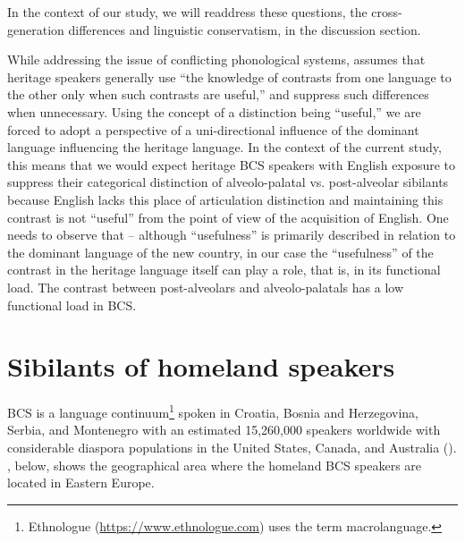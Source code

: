 \documentclass[output=paper,modfonts,nonflat,
]{langsci/langscibook}
\begin{document}
In the context of our study, we will readdress these questions, the cross-generation differences and linguistic conservatism, in the discussion section.



While addressing the issue of conflicting phonological systems, \citet{Polinskyinprep} assumes that heritage speakers generally use “the knowledge of contrasts from one language to the other only when such contrasts are useful,” and suppress such differences when unnecessary. Using the concept of a distinction being “useful,” we are forced to adopt a perspective of a uni-directional influence of the dominant language influencing the heritage language. In the context of the current study, this means that we would expect heritage BCS speakers with English exposure to suppress their categorical distinction of alveolo-palatal vs. post-alveolar sibilants because English lacks this place of articulation distinction and maintaining this contrast is not “useful” from the point of view of the acquisition of English. One needs to observe that – although “usefulness” is primarily described in relation to the dominant language of the new country, in our case the “usefulness” of the contrast in the heritage language itself can play a role, that is, in its functional load. The contrast between post-alveolars and alveolo-palatals has a low functional load in BCS.


\section{Sibilants of homeland speakers}\label{sec:mihajlovic:3}

BCS is a language continuum\footnote{Ethnologue (\url{https://www.ethnologue.com}) uses the term macrolanguage.} spoken in Croatia, Bosnia and Herzegovina, Serbia, and Montenegro with an estimated 15,260,000 speakers worldwide with considerable diaspora populations in the United States, Canada, and Australia (\citealt{SimonsFennis2017}). , below, shows the geographical area where the homeland BCS speakers are located in Eastern Europe.
\end{document}
